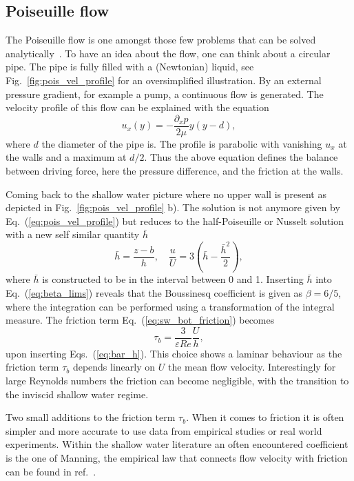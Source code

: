 \subsection{Poiseuille flow}
The Poiseuille flow is one amongst those few problems that can be solved analytically~\cite{sutera1993history}.
To have an idea about the flow, one can think about a circular pipe.
The pipe is fully filled with a (Newtonian) liquid, see Fig.~\ref{fig:pois_vel_profile} for an oversimplified illustration.
By an external pressure gradient, for example a pump, a continuous flow is generated.
The velocity profile of this flow can be explained with the equation~\cite{batchelor2000introduction, krugerLatticeBoltzmannMethod2017}
\begin{equation}\label{eq:pois_vel_profile}
    u_x(y) = -\frac{\partial_x p}{2\mu}y(y-d),
\end{equation}
where $d$ the diameter of the pipe is.
The profile is parabolic with vanishing $u_x$ at the walls and a maximum at $d/2$. 
Thus the above equation defines the balance between driving force, here the pressure difference, and the friction at the walls.

Coming back to the shallow water picture where no upper wall is present as depicted in Fig.~\ref{fig:pois_vel_profile} b).
The solution is not anymore given by Eq.~(\ref{eq:pois_vel_profile}) but reduces to the half-Poiseuille or Nusselt solution with a new self similar quantity $\bar{h}$~\cite{james2019towards}
\begin{equation}\label{eq:bar_h}
    \bar{h} = \frac{z - b}{h}, \quad \frac{u}{U} = 3\left(\bar{h} - \frac{\bar{h}^2}{2}\right), 
\end{equation}
where $\bar{h}$ is constructed to be in the interval between 0 and 1.
Inserting $\bar{h}$ into Eq.~(\ref{eq:beta_lims}) reveals that the Boussinesq coefficient is given as $\beta = 6/5$, where the integration can be performed using a transformation of the integral measure.
The friction term Eq.~(\ref{eq:sw_bot_friction}) becomes 
\begin{equation}
    \tau_b = \frac{3}{\varepsilon Re}\frac{U}{h} ,
\end{equation}
upon inserting Eqs.~(\ref{eq:bar_h}).
This choice shows a laminar behaviour as the friction term $\tau_b$ depends linearly on $U$ the mean flow velocity.
Interestingly for large Reynolds numbers the friction can become negligible, with the transition to the inviscid shallow water regime.

Two small additions to the friction term $\tau_b$.
When it comes to friction it is often simpler and more accurate to use data from empirical studies or real world experiments.
Within the shallow water literature an often encountered coefficient is the one of Manning, the empirical law that connects flow velocity with friction can be found in ref.~\cite{sturm2021open}.

